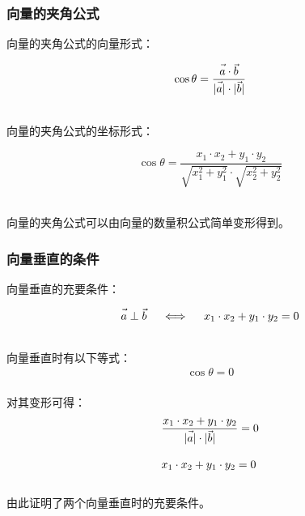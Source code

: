 \documentclass[UTF8]{ctexart}
\let\nvec\vec
\def\vec#1{\nvec{\vphantom b\smash{#1}}}
\begin{document}
\subsubsection{向量的夹角公式}
    向量的夹角公式的向量形式：
    \begin{large}
        \begin{equation*}
            \cos\theta=\frac{\vec{a}\cdot\vec{b}}{|\vec{a}|\cdot|\vec{b}|}
        \end{equation*}
    \end{large}\\
    向量的夹角公式的坐标形式：
    \begin{large}
        \begin{equation*}
            \cos\theta=\frac{x_1\cdot x_2+y_1\cdot y_2}{\sqrt{x_1^2+y_1^2}\cdot\sqrt{x_2^2+y_2^2}}
        \end{equation*}
    \end{large}\\
    向量的夹角公式可以由向量的数量积公式简单变形得到。

\newpage

\subsubsection{向量垂直的条件}
    \setcounter{equation}{0}
    向量垂直的充要条件：
    \begin{large}
        \begin{equation*}
            \vec{a}\perp\vec{b}~~~~\Longleftrightarrow~~~~x_1\cdot x_2+y_1\cdot y_2=0
        \end{equation*}
    \end{large}\\
    向量垂直时有以下等式：
    \begin{align}
        \cos\theta=0
    \end{align}\\
    对其变形可得：
    \begin{align}
        &\frac{x_1\cdot x_2+y_1\cdot y_2}{|\vec{a}|\cdot|\vec{b}|}=0\\[3mm]
        &x_1\cdot x_2+y_1\cdot y_2=0
    \end{align}\\
    由此证明了两个向量垂直时的充要条件。\\
\end{document}
